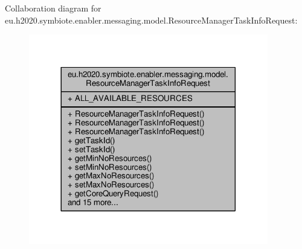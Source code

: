 Collaboration diagram for eu.\+h2020.\+symbiote.\+enabler.\+messaging.\+model.\+Resource\+Manager\+Task\+Info\+Request\+:\nopagebreak
\begin{figure}[H]
\begin{center}
\leavevmode
\includegraphics[width=296pt]{classeu_1_1h2020_1_1symbiote_1_1enabler_1_1messaging_1_1model_1_1ResourceManagerTaskInfoRequest__coll__graph}
\end{center}
\end{figure}
